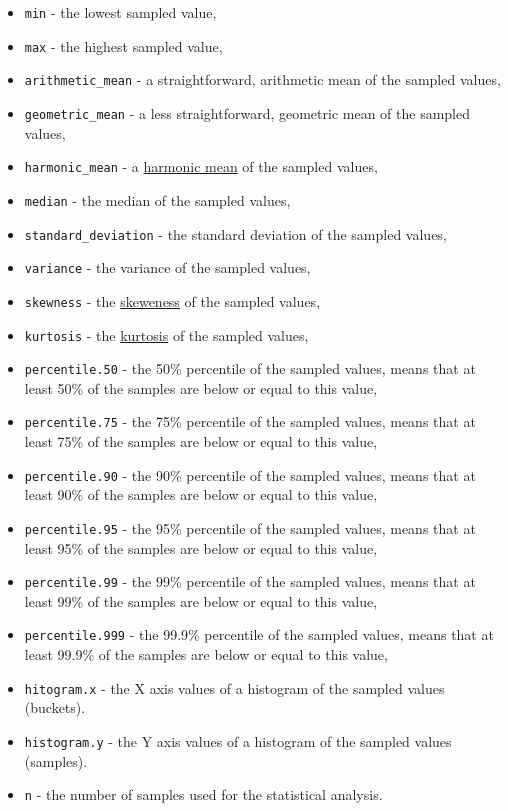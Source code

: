 \documentclass[a4paper]{article}
\begin{document}
\begin{itemize}
\item \texttt{min} - the lowest sampled value,
\item \texttt{max} - the highest sampled value,
\item \texttt{arithmetic\_mean} - a straightforward, arithmetic mean of the sampled values,
\item \texttt{geometric\_mean} - a less straightforward, geometric mean of the sampled values,
\item \texttt{harmonic\_mean} - a \href{https://en.wikipedia.org/wiki/Harmonic_mean}{harmonic mean} of the sampled values,
\item \texttt{median} - the median of the sampled values,
\item \texttt{standard\_deviation} - the standard deviation of the sampled values,
\item \texttt{variance} - the variance of the sampled values,
\item \texttt{skewness} - the \href{https://en.wikipedia.org/wiki/Skewness}{skeweness} of the sampled values,
\item \texttt{kurtosis} - the \href{https://en.wikipedia.org/wiki/Kurtosis}{kurtosis} of the sampled values,
\item \texttt{percentile.50} - the 50\% percentile of the sampled values, means that at least 50\% of the samples are below or equal to this value,
\item \texttt{percentile.75} - the 75\% percentile of the sampled values, means that at least 75\% of the samples are below or equal to this value,
\item \texttt{percentile.90} - the 90\% percentile of the sampled values, means that at least 90\% of the samples are below or equal to this value,
\item \texttt{percentile.95} - the 95\% percentile of the sampled values, means that at least 95\% of the samples are below or equal to this value,
\item \texttt{percentile.99} - the 99\% percentile of the sampled values, means that at least 99\% of the samples are below or equal to this value,
\item \texttt{percentile.999} - the 99.9\% percentile of the sampled values, means that at least 99.9\% of the samples are below or equal to this value,
\item \texttt{hitogram.x} - the X axis values of a histogram of the sampled values (buckets).
\item \texttt{histogram.y} - the Y axis values of a histogram of the sampled values (samples).
\item \texttt{n} - the number of samples used for the statistical analysis.
\end{itemize}
\end{document}
